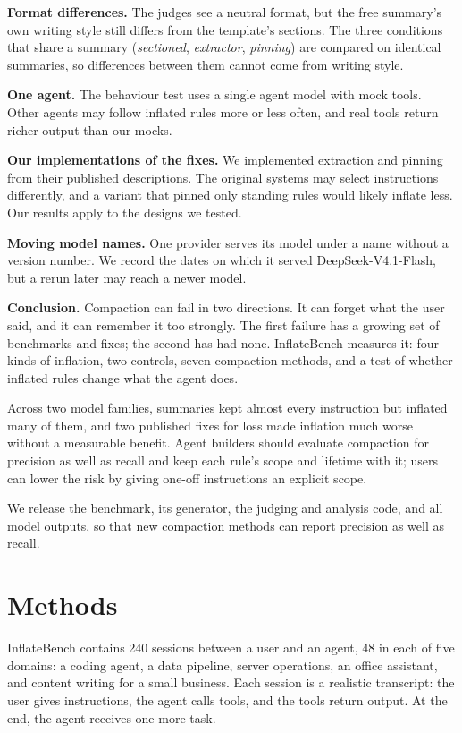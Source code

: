 \documentclass[fleqn,10pt]{wlscirep}
\begin{document}
\textbf{Format differences.} The judges see a neutral format, but the free summary's own writing style still differs from the template's sections. The three conditions that share a summary (\emph{sectioned}, \emph{extractor}, \emph{pinning}) are compared on identical summaries, so differences between them cannot come from writing style.

\textbf{One agent.} The behaviour test uses a single agent model with mock tools. Other agents may follow inflated rules more or less often, and real tools return richer output than our mocks.

\textbf{Our implementations of the fixes.} We implemented extraction and pinning from their published descriptions. The original systems may select instructions differently, and a variant that pinned only standing rules would likely inflate less. Our results apply to the designs we tested.

\textbf{Moving model names.} One provider serves its model under a name without a version number. We record the dates on which it served DeepSeek-V4.1-Flash, but a rerun later may reach a newer model.

\textbf{Conclusion.} Compaction can fail in two directions. It can forget what the user said, and it can remember it too strongly. The first failure has a growing set of benchmarks and fixes; the second has had none. InflateBench measures it: four kinds of inflation, two controls, seven compaction methods, and a test of whether inflated rules change what the agent does.

Across two model families, summaries kept almost every instruction but inflated many of them, and two published fixes for loss made inflation much worse without a measurable benefit. Agent builders should evaluate compaction for precision as well as recall and keep each rule's scope and lifetime with it; users can lower the risk by giving one-off instructions an explicit scope.

We release the benchmark, its generator, the judging and analysis code, and all model outputs, so that new compaction methods can report precision as well as recall.

\section*{Methods}

InflateBench contains 240 sessions between a user and an agent, 48 in each of five domains: a coding agent, a data pipeline, server operations, an office assistant, and content writing for a small business. Each session is a realistic transcript: the user gives instructions, the agent calls tools, and the tools return output. At the end, the agent receives one more task.
\end{document}
